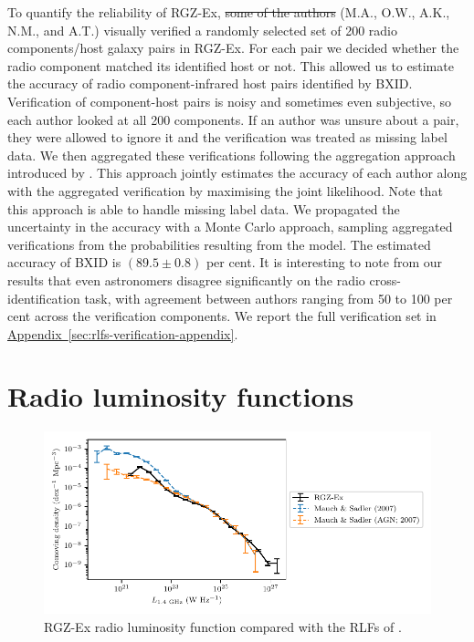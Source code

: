 \documentclass[11pt, a4paper]{book}
\newcommand{\aref}[1]{\hyperref[#1]{Appendix~\ref{#1}}}
\providecommand{\DIFaddtex}[1]{{\protect\color{blue}\uwave{#1}}} %
\providecommand{\DIFdeltex}[1]{{\protect\color{red}\sout{#1}}}                      %
\providecommand{\DIFaddbegin}{} %
\providecommand{\DIFaddend}{} %
\providecommand{\DIFdelbegin}{} %
\providecommand{\DIFdelend}{} %
\providecommand{\DIFadd}[1]{\texorpdfstring{\DIFaddtex{#1}}{#1}} %
\providecommand{\DIFdel}[1]{\texorpdfstring{\DIFdeltex{#1}}{}} %
\newcommand{\DIFscaledelfig}{0.5}
\newlength{\DIFdelgraphicswidth} %
\newlength{\DIFdelgraphicsheight} %
\newcommand{\DIFaddincludegraphics}[2][]{{\color{blue}\fbox{\DIFOincludegraphics[#1]{#2}}}} %
\newcommand{\DIFdelincludegraphics}[2][]{%
\sbox{\DIFdelgraphicsbox}{\DIFOincludegraphics[#1]{#2}}%
\settoboxwidth{\DIFdelgraphicswidth}{\DIFdelgraphicsbox} %
\settoboxtotalheight{\DIFdelgraphicsheight}{\DIFdelgraphicsbox} %
\scalebox{\DIFscaledelfig}{%
\parbox[b]{\DIFdelgraphicswidth}{\usebox{\DIFdelgraphicsbox}\\[-\baselineskip] \rule{\DIFdelgraphicswidth}{0em}}\llap{\resizebox{\DIFdelgraphicswidth}{\DIFdelgraphicsheight}{%
\setlength{\unitlength}{\DIFdelgraphicswidth}%
\begin{picture}(1,1)%
\thicklines\linethickness{2pt} %
{\color[rgb]{1,0,0}\put(0,0){\framebox(1,1){}}}%
{\color[rgb]{1,0,0}\put(0,0){\line( 1,1){1}}}%
{\color[rgb]{1,0,0}\put(0,1){\line(1,-1){1}}}%
\end{picture}%
}\hspace*{3pt}}} %
} %
\DeclareRobustCommand{\DIFaddbegin}{\DIFOaddbegin \let\includegraphics\DIFaddincludegraphics} %
\DeclareRobustCommand{\DIFaddend}{\DIFOaddend \let\includegraphics\DIFOincludegraphics} %
\DeclareRobustCommand{\DIFdelbegin}{\DIFOdelbegin \let\includegraphics\DIFdelincludegraphics} %
\DeclareRobustCommand{\DIFdelend}{\DIFOaddend \let\includegraphics\DIFOincludegraphics} %
\begin{document}
    To quantify the reliability of RGZ-Ex, \DIFdelbegin \DIFdel{some of the authors }\DIFdelend \DIFaddbegin \DIFadd{we }\DIFaddend (M.A., O.W., A.K., N.M., and A.T.) visually verified a randomly selected set of 200 radio components/host galaxy pairs in RGZ-Ex. For each pair we decided whether the radio component matched its identified host or not. This allowed us to estimate the accuracy of radio component-infrared host pairs identified by BXID. Verification of component-host pairs is noisy and sometimes even subjective, so each author looked at all 200 components. If an author was unsure about a pair, they were allowed to ignore it and the verification was treated as missing label data. We then aggregated these verifications following the aggregation approach introduced by \citet{dawid79em}. This approach jointly estimates the accuracy of each author along with the aggregated verification by maximising the joint likelihood. Note that this approach is able to handle missing label data. We propagated the uncertainty in the accuracy with a Monte Carlo approach, sampling aggregated verifications from the probabilities resulting from the \citeauthor{dawid79em} model. The estimated accuracy of BXID is $(89.5 \pm 0.8)$ per cent. It is interesting to note from our results that even astronomers disagree significantly on the radio cross-identification task, with agreement between authors ranging from 50 to 100 per cent across the verification components. We report the full verification set in \DIFdelbegin %
\DIFdelend \DIFaddbegin \aref{sec:rlfs-verification-appendix}\DIFaddend .

\section{Radio luminosity functions}
\label{sec:rlfs-rlf}

  \begin{figure}
      \centering
    \includegraphics{rlf-images/rlf.pdf}
    \caption{RGZ-Ex radio luminosity function compared with the RLFs of \citet{mauch07rlf}.
      \label{fig:rlf}}
  \end{figure}
\end{document}
